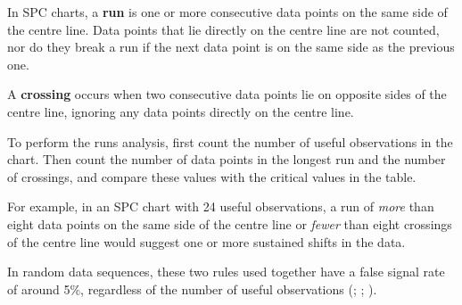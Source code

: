 \documentclass[
]{book}
\begin{document}
In SPC charts, a \textbf{run} is one or more consecutive data points on
the same side of the centre line. Data points that lie directly on the
centre line are not counted, nor do they break a run if the next data
point is on the same side as the previous one.

A \textbf{crossing} occurs when two consecutive data points lie on
opposite sides of the centre line, ignoring any data points directly on
the centre line.

To perform the runs analysis, first count the number of useful
observations in the chart. Then count the number of data points in the
longest run and the number of crossings, and compare these values with
the critical values in the table.

For example, in an SPC chart with 24 useful observations, a run of
\emph{more} than eight data points on the same side of the centre line
or \emph{fewer} than eight crossings of the centre line would suggest
one or more sustained shifts in the data.

In random data sequences, these two rules used together have a false
signal rate of around 5\%, regardless of the number of useful
observations (;
; ).
\end{document}
